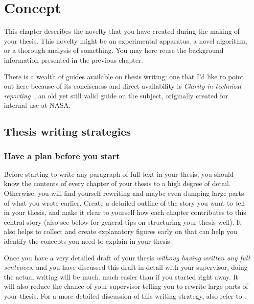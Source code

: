 \chapter{Concept}
\label{chap:concept}

This chapter describes the novelty that you have created during the making of your thesis.
This novelty might be an experimental apparatus, a novel algorithm, or a thorough analysis of something.
You may here reuse the background information presented in the previous chapter.

There is a wealth of guides available on thesis writing; one that I'd like to point out here because of its conciseness and direct availability is \emph{Clarity in technical reporting}~\cite{Katzoff64}, an old yet still valid guide on the subject, originally created for internal use at NASA.

\section{Thesis writing strategies}

\subsection{Have a plan before you start}
Before starting to write any paragraph of full text in your thesis, you should know the contents of every chapter of your thesis to a high degree of detail.
Otherwise, you will find yourself rewriting and maybe even dumping large parts of what you wrote earlier.
Create a detailed outline of the story you want to tell in your thesis, and make it clear to yourself how each chapter contributes to this central story (also see below for general tips on structuring your thesis well).
It also helps to collect and create explanatory figures early on that can help you identify the concepts you need to explain in your thesis.

Once you have a very detailed draft of your thesis \emph{withoug having written any full sentences}, and you have discussed this draft in detail with your supervisor, doing the actual writing will be much, much easier than if you started right away.
It will also reduce the chance of your supervisor telling you to rewrite large parts of your thesis.
For a more detailed discussion of this writing strategy, also refer to \textcite{Carlis09}.

